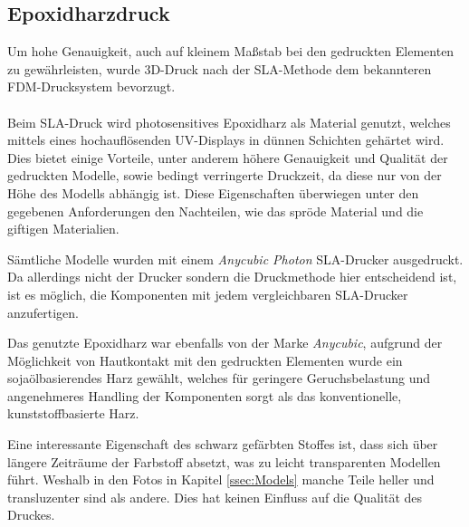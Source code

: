 \documentclass[paper=a4,12pt]{scrreprt}
\begin{document}
\subsection{Epoxidharzdruck}
\label{ssec:Print}
Um hohe Genauigkeit, auch auf kleinem Maßstab bei den gedruckten
Elementen zu gewährleisten, wurde 3D-Druck nach der SLA-Methode
dem bekannteren FDM-Drucksystem bevorzugt.
\\\\
Beim SLA-Druck wird photosensitives Epoxidharz als Material genutzt, welches
mittels eines hochauflösenden UV-Displays in dünnen Schichten gehärtet wird.
Dies bietet einige Vorteile, unter anderem höhere Genauigkeit und Qualität der
gedruckten Modelle, sowie bedingt verringerte Druckzeit,
da diese nur von der Höhe des Modells abhängig ist.
Diese Eigenschaften überwiegen unter den gegebenen Anforderungen den
Nachteilen, wie das spröde Material und die giftigen Materialien.


Sämtliche Modelle wurden mit einem \textit{Anycubic Photon} SLA-Drucker ausgedruckt. Da
allerdings nicht der Drucker sondern die Druckmethode hier entscheidend ist, ist es möglich,
die Komponenten mit jedem vergleichbaren SLA-Drucker anzufertigen.

Das genutzte Epoxidharz war ebenfalls von der Marke \textit{Anycubic},
aufgrund der Möglichkeit von Hautkontakt mit den gedruckten Elementen
wurde ein sojaölbasierendes Harz gewählt, welches für geringere Geruchsbelastung
und angenehmeres Handling der Komponenten sorgt als das konventionelle,
kunststoffbasierte Harz.

Eine interessante Eigenschaft des schwarz gefärbten Stoffes ist, dass
sich über längere Zeiträume der Farbstoff absetzt, was zu leicht transparenten Modellen führt. Weshalb in den Fotos in Kapitel \ref{ssec:Models}
manche Teile heller und transluzenter sind als andere.
Dies hat keinen Einfluss auf die Qualität des Druckes.
\end{document}
